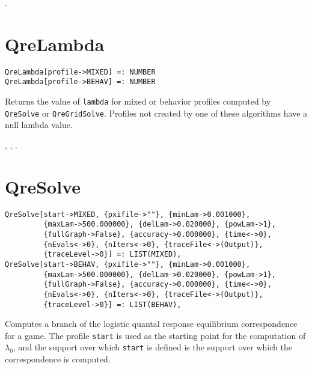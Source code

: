 \seealso {}.


\section*{QreLambda}\label{PrimQreLambda}
\begin{verbatim}
QreLambda[profile->MIXED] =: NUMBER 
QreLambda[profile->BEHAV] =: NUMBER 
\end{verbatim}

\noindent
Returns the value of \verb+lambda+ for mixed or behavior profiles
computed by \verb+QreSolve+ or \verb+QreGridSolve+.  Profiles not
created by one of these algorithms have a null lambda value.

\seealso {},
, .


\section*{QreSolve}\label{PrimQreSolve}
\begin{verbatim}
QreSolve[start->MIXED, {pxifile->""}, {minLam->0.001000}, 
         {maxLam->500.000000}, {delLam->0.020000}, {powLam->1}, 
         {fullGraph->False}, {accuracy->0.000000}, {time<->0}, 
         {nEvals<->0}, {nIters<->0}, {traceFile<->(Output)}, 
         {traceLevel->0}] =: LIST(MIXED),
QreSolve[start->BEHAV, {pxifile->""}, {minLam->0.001000}, 
         {maxLam->500.000000}, {delLam->0.020000}, {powLam->1}, 
         {fullGraph->False}, {accuracy->0.000000}, {time<->0}, 
         {nEvals<->0}, {nIters<->0}, {traceFile<->(Output)}, 
         {traceLevel->0}] =: LIST(BEHAV),
\end{verbatim}

\noindent
Computes a branch of the logistic quantal response equilibrium
correspondence for a game.  The profile \texttt{start} is
used as the starting point for the computation of $\lambda_{0}$, and
the support over which \texttt{start} is defined is the support over
which the correspondence is computed.

